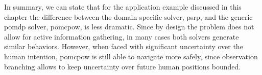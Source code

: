 In summary, we can state that for the application example discussed in this
chapter the difference between the domain specific solver, \ac{psrp}, and the
generic \ac{pomdp} solver, \ac{pomcpow}, is less dramatic. Since by design the
problem does not allow for active information gathering, in many cases both
solvers generate similar behaviors. However, when faced with significant
uncertainty over the human intention, \ac{pomcpow} is still able to navigate
more safely, since observation branching allows to keep uncertainty over future
human positions bounded.
